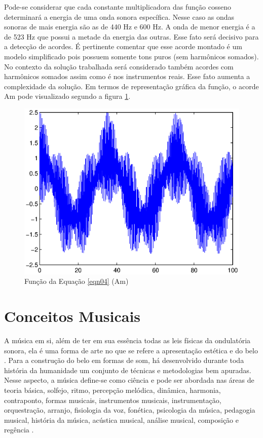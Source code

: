 Pode-se considerar que cada constante multiplicadora das função cosseno determinará a energia de uma onda sonora específica. Nesse caso as ondas sonoras de mais energia são as de 440 Hz e 600 Hz. A onda de menor energia é a de 523 Hz que possui a metade da energia das outras. Esse fato será decisivo para a detecção de acordes. É pertinente comentar que esse acorde montado é um modelo simplificado pois possuem somente tons puros (sem harmônicos somados). No contexto da solução trabalhada será considerado também acordes com harmônicos somados assim como é nos instrumentos reais. Esse fato aumenta a complexidade da solução. Em termos de representação gráfica da função, o acorde Am pode visualizado segundo a figura \ref{fig_Am}.
\begin{figure}[h]
	\centering
		\includegraphics[scale=1]{figuras/Amcos.eps}
	\caption{Função da Equação \ref{eqn04} (Am)}
	\label{fig_Am}
\end{figure}

\section{Conceitos Musicais}
\label{sec:conceitosmusicais}

A música em si, além de ter em sua essência todas as leis físicas da ondulatória sonora, ela é uma forma de arte no que se refere a apresentação estética e do belo \cite{wolfflin2000conceitos}. Para a construção do belo em formas de som, há desenvolvido durante toda história da humanidade um conjunto de técnicas e metodologias bem apuradas. Nesse aspecto, a música define-se como ciência e pode ser abordada nas áreas de teoria básica, solfejo, ritmo, percepção melódica, dinâmica, harmonia, contraponto, formas musicais, instrumentos musicais, instrumentação, orquestração, arranjo, fisiologia da voz, fonética, psicologia da música, pedagogia musical, história da música, acústica musical, análise musical, composição e regência \cite{med1996teoria}.

